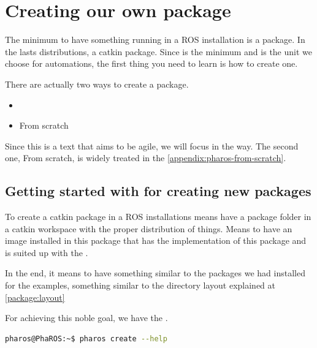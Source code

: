 \documentclass[a4paper,10pt,twoside]{book}
\begin{document}
\fi
\sloppy
\chapter{ Creating our own package }
				
				
				The minimum to have something running in a ROS installation is a package. In the lasts distributions, a catkin package.
				Since is the minimum and is the unit we choose for automations, the first thing you need to learn is how to create one.
				
				There are actually two ways to create a package.
				
				\begin{itemize}
					\item \installationTool{}
					\item From scratch
				\end{itemize}
				

				Since this is a text that aims to be agile, we will focus in the \installationTool{} way. The second one, From scratch, is widely treated in the  \autoref{appendix:pharos-from-scratch}.

				\section{Getting started with \installationTool{} for creating new packages}
				
				
				To create a catkin package in a ROS installations means have a package folder in a catkin workspace with the proper distribution of things. Means to have an image installed in this package that has the implementation of this package and is suited up with the \fwkName{}.
				
				In the end, it means to have something similar to the packages we had installed for the examples, something similar to the directory layout explained at \autoref{package:layout}

				For achieving this noble goal, we have the \installationTool{}.
				
					
				\begin{lstlisting}[language=bash,title={ Package creation }]
					pharos@PhaROS:~$ pharos create --help
				\end{lstlisting} 
			 			
\end{document}
